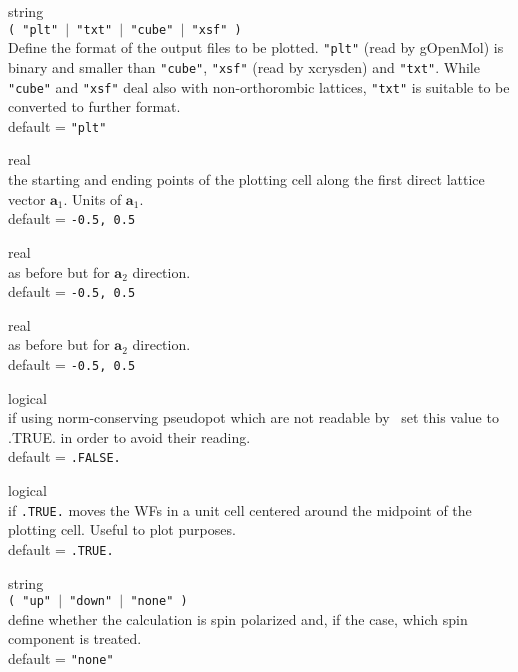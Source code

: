 {\noindent{}%
{\sc string} \\ {\tt ( "plt" $\mid$ "txt" $\mid$ "cube" $\mid$ "xsf" ) }\\
              Define the format of the output files to be plotted. 
              {\tt "plt"} (read by {\sc gOpenMol}) is binary and smaller than 
              {\tt "cube"}, {\tt "xsf"} (read by {\sc xcrysden}) and
              {\tt "txt"}. While {\tt "cube"} and {\tt "xsf"} deal also 
              with non-orthorombic lattices, {\tt "txt"} is suitable to be converted 
              to further format.\\
              {\sc default} = {\tt "plt"} \par

\noindent{}%
{\sc real} \\ the starting and ending points of the plotting cell along the 
              first direct lattice vector $\mathbf{a}_1$.
              Units of $\mathbf{a}_1$.\\
              {\sc default} = {\tt -0.5, 0.5} \par

\noindent{}%
{\sc real} \\ as before but for $\mathbf{a}_2$ direction.\\
              {\sc default} = {\tt -0.5, 0.5} \par

\noindent{}%
{\sc real} \\ as before but for $\mathbf{a}_2$ direction.\\
              {\sc default} = {\tt -0.5, 0.5} \par

\noindent{}%
{\sc logical} \\ if using norm-conserving pseudopot which are not readable 
               by \WANT\ set this value to .TRUE. in order to avoid their reading.\\
              {\sc default} = {\tt .FALSE.} \par

\noindent{}%
{\sc logical} \\ if {\tt .TRUE.} moves the WFs in a unit cell centered around the 
    midpoint of the plotting cell. Useful to plot purposes.\\
              {\sc default} = {\tt .TRUE.} \par

\noindent{}%
{\sc string} \\ {\tt ( "up" $\mid$ "down" $\mid$ "none" ) }\\
              define whether the calculation is spin polarized and, if the case,
              which spin component is treated.\\
              {\sc default} = {\tt "none"} \par
}\bigskip

